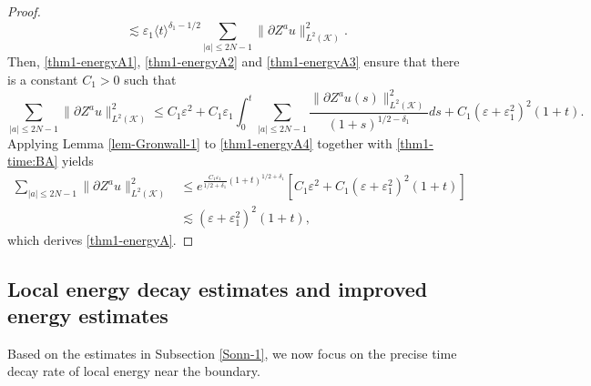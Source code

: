 \documentclass[11pt,twoside]{article}
\def\cK{\mathcal K}
\def\p{\partial}
\def\ve{\varepsilon}
\def\ls{\lesssim}
\newcommand{\w}[1]{\langle {#1} \rangle}
\theoremstyle{plain}
\theoremstyle{definition}
\numberwithin{equation}{section}
\begin{document}
\begin{proof}
\begin{equation}
\ls\ve_1\w{t}^{\delta_1-1/2}\sum_{|a|\le2N-1}\|\p Z^au\|^2_{L^2(\cK)}.
\end{equation}
Then, \eqref{thm1-energyA1}, \eqref{thm1-energyA2} and \eqref{thm1-energyA3} ensure that there is a constant $C_1>0$ such that
\begin{equation}\label{thm1-energyA4}
\sum_{|a|\le2N-1}\|\p Z^au\|^2_{L^2(\cK)}\le C_1\ve^2
+C_1\ve_1\int_0^t\sum_{|a|\le2N-1}\frac{\|\p Z^au(s)\|^2_{L^2(\cK)}}{(1+s)^{1/2-\delta_1}}ds+C_1(\ve+\ve_1^2)^2(1+t).
\end{equation}
Applying Lemma \ref{lem-Gronwall-1} to \eqref{thm1-energyA4} together with \eqref{thm1-time:BA} yields
\begin{equation*}
\begin{split}
\sum_{|a|\le2N-1}\|\p Z^au\|^2_{L^2(\cK)}&\le e^{\frac{C_1\ve_1}{1/2+\delta_1}(1+t)^{1/2+\delta_1}}[C_1\ve^2+C_1(\ve+\ve_1^2)^2(1+t)]\\
&\ls(\ve+\ve_1^2)^2(1+t),
\end{split}
\end{equation*}
which derives \eqref{thm1-energyA}.
\end{proof}


\subsection{Local energy decay estimates and improved energy estimates}\label{sect5}

Based on the estimates in Subsection \ref{Sonn-1}, we now focus on the precise time decay rate of
local energy near the boundary.
\end{document}
